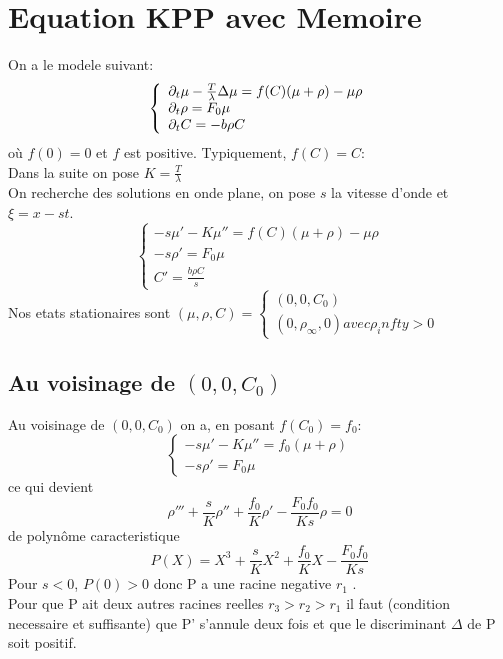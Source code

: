 \section{Equation KPP avec Memoire}
On a le modele suivant: 
\begin{equation} \left\{
                \begin{array}{ll}
                   \partial_t\mu -\frac{T}{\lambda}\Delta\mu = f(C)(\mu + \rho) -\mu\rho\\
                 \partial_t\rho=  F_0 \mu \\
                  \partial_t C = -b\rho C
                \end{array}
              \right.
\end{equation} 
où $f(0)=0$ et $f$ est positive. Typiquement, $f(C)=C$:\\
Dans la suite on pose $K= \frac{T}{\lambda}$\\
On recherche des solutions en onde plane, on pose $s$ la vitesse d'onde et $\xi = x - st$. \\
\begin{equation} \left\{ \begin{array}{ll} -s \mu'-K\mu''=f(C)(\mu+\rho)-\mu\rho \\ -s\rho' = F_0\mu  \\C'=\frac{b\rho C}{s} \end{array}\right.
\end{equation}
Nos etats stationaires sont $(\mu,\rho,C) = \left\{ \begin{array}{ll} (0,0,C_0) \\
 (0,\rho_\infty,0) avec \rho_infty > 0 \end{array} \right.$ 
\subsection{Au voisinage de $(0,0,C_0)$}
Au voisinage de $(0,0,C_0)$ on a, en posant $f(C_0)=f_0$:
\begin{equation} \left\{ \begin{array}{ll} -s \mu'-K\mu''=f_0(\mu+\rho) \\ -s\rho' = F_0\mu   \end{array}\right.
\end{equation} ce qui devient  \begin{equation} \rho''' +\frac{s}{K}\rho''+\frac{f_0}{K}\rho'-\frac{F_0f_0}{Ks}\rho =0 \end{equation} de polynôme caracteristique \begin{equation} P(X)= X^3 +\frac{s}{K}X^2+\frac{f_0}{K}X-\frac{F_0f_0}{Ks} \end{equation}
Pour $s<0$,   $P(0)>0$ donc P a une racine negative $r_1$ .\\
Pour que P ait deux autres racines reelles $r_3>r_2>r_1$ il faut (condition necessaire et suffisante) que P' s'annule deux fois et que le discriminant $\Delta$ de P soit positif.
